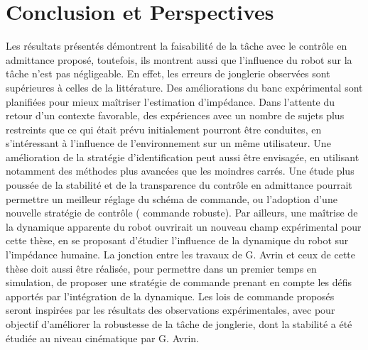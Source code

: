 \documentclass[12pt, a4paper]{article} %
\numberwithin{equation}{section}
\begin{document}
\section{Conclusion et Perspectives} \label{sec_conclusion}

Les résultats présentés démontrent la faisabilité de la tâche avec le contrôle en admittance proposé, toutefois, ils montrent aussi que l'influence du robot sur la tâche n'est pas négligeable. En effet, les erreurs de jonglerie observées sont supérieures à celles de la littérature. Des améliorations du banc expérimental sont planifiées pour mieux maîtriser l'estimation d'impédance. 
%
\newlineBlank
% 
Dans l'attente du retour d'un contexte favorable, des expériences avec un nombre de sujets plus restreints que ce qui était prévu initialement pourront être conduites, en s'intéressant à l'influence de l'environnement sur un même utilisateur. Une amélioration de la stratégie d'identification peut aussi être envisagée, en utilisant notamment des méthodes plus avancées que les moindres carrés.
%
\newlineBlank
%
Une étude plus poussée de la stabilité et de la transparence du contrôle en admittance pourrait permettre un meilleur réglage du schéma de commande, ou l'adoption d'une nouvelle stratégie de contrôle ( commande robuste). Par ailleurs, une maîtrise de la dynamique apparente du robot ouvrirait un nouveau champ expérimental pour cette thèse, en se proposant d'étudier l'influence de la dynamique du robot sur l'impédance humaine.
%
\newlineBlank
% 
La jonction entre les travaux de G. Avrin et ceux de cette thèse doit aussi être réalisée, pour permettre dans un premier temps en simulation, de proposer une stratégie de commande prenant en compte les défis apportés par l'intégration de la dynamique. Les lois de commande proposés seront inspirées par les résultats des observations expérimentales, avec pour objectif d'améliorer la robustesse de la tâche de jonglerie, dont la stabilité a été étudiée au niveau cinématique par G. Avrin.




\newpage

\end{document}
